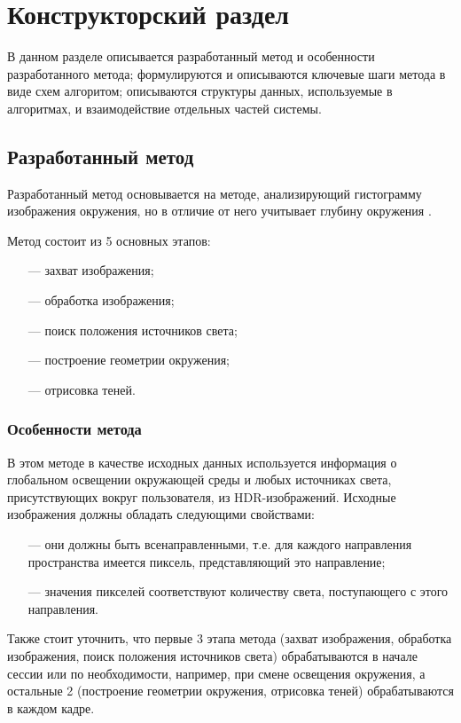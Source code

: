 \chapter{Конструкторский раздел}

В данном разделе описывается разработанный метод и особенности разработанного метода; формулируются и описываются ключевые шаги метода в виде схем алгоритом; описываются структуры данных, используемые в алгоритмах, и взаимодействие отдельных частей системы.

\section{Разработанный метод}

Разработанный метод основывается на методе, анализирующий гистограмму изображения окружения, но в отличие от него учитывает глубину окружения \cite{osti2019real}.

Метод состоит из 5 основных этапов:

\begin{enumerate}
	\item[---] захват изображения;
	\item[---] обработка изображения;
	\item[---] поиск положения источников света;
	\item[---] построение геометрии окружения;
	\item[---] отрисовка теней.
\end{enumerate}

\subsection{Особенности метода}

В этом методе в качестве исходных данных используется информация о глобальном освещении окружающей среды и любых источниках света, присутствующих вокруг пользователя, из HDR-изображений. Исходные изображения должны обладать следующими свойствами:

\begin{itemize}
	\item[---] они должны быть всенаправленными, т.е. для каждого направления пространства имеется пиксель, представляющий это направление;
	\item[---] значения пикселей соответствуют количеству света, поступающего с этого направления.
\end{itemize}

Также стоит уточнить, что первые 3 этапа метода (захват изображения, обработка изображения, поиск положения источников света) обрабатываются в начале сессии или по необходимости, например, при смене освещения окружения, а остальные 2 (построение геометрии окружения, отрисовка теней) обрабатываются в каждом кадре.

